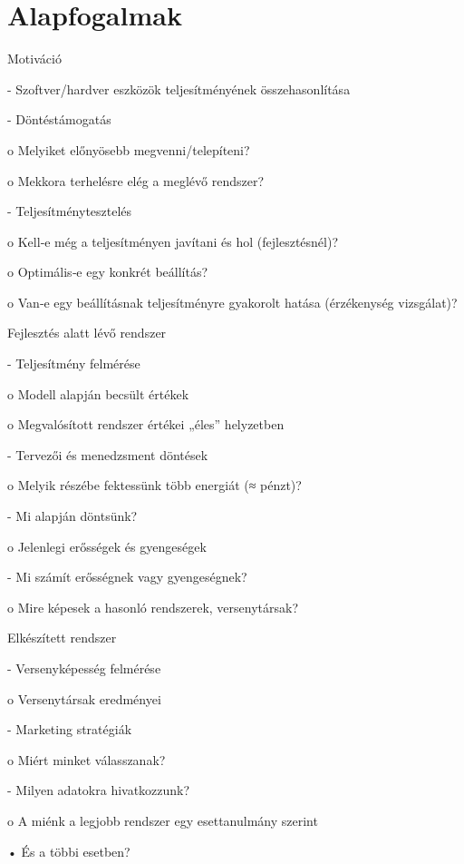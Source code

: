 \label{cha:benchmarking}

\graphicspath{ {./benchmarking/figures/} }


\section{Alapfogalmak}

Motiváció

- Szoftver/hardver eszközök teljesítményének összehasonlítása

- Döntéstámogatás 

o Melyiket előnyösebb megvenni/telepíteni?

o Mekkora terhelésre elég a meglévő rendszer?

- Teljesítménytesztelés 

o Kell‐e még a teljesítményen javítani és hol 
(fejlesztésnél)?

o Optimális‐e egy konkrét beállítás?

o Van‐e egy beállításnak teljesítményre gyakorolt hatása 
(érzékenység vizsgálat)?

Fejlesztés alatt lévő rendszer

- Teljesítmény felmérése

o Modell alapján becsült értékek

o Megvalósított rendszer értékei „éles” helyzetben

- Tervezői és menedzsment döntések

o Melyik részébe fektessünk több energiát (≈ pénzt)? 

- Mi alapján döntsünk?

o Jelenlegi erősségek és gyengeségek

- Mi számít erősségnek vagy gyengeségnek?

o Mire képesek a hasonló rendszerek, versenytársak?

Elkészített rendszer

- Versenyképesség felmérése

o Versenytársak eredményei

- Marketing stratégiák

o Miért minket válasszanak?

- Milyen adatokra hivatkozzunk?

o A miénk a legjobb rendszer egy esettanulmány szerint

• És a többi esetben?

